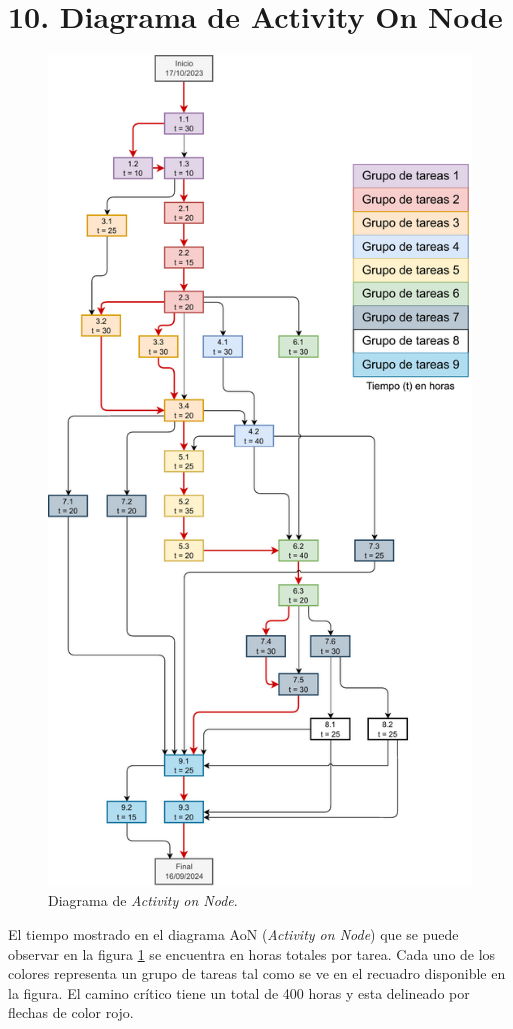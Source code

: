 \documentclass[
11pt, %
]{charter}
\begin{document}
\section{10. Diagrama de Activity On Node}
\label{sec:AoN}



\begin{figure}[htpb]
\centering 
\includegraphics[width=.7\textwidth]{./Figuras/AoN.pdf}
\caption{Diagrama de \textit{Activity on Node}.}
\label{fig:AoN}
\end{figure}

El tiempo mostrado en el diagrama AoN (\textit{Activity on Node}) que se puede observar en la figura \ref{fig:AoN} se encuentra en horas totales por tarea. Cada uno de los colores representa un grupo de tareas tal como se ve en el recuadro disponible en la figura. El camino crítico tiene un total de 400 horas y esta delineado por flechas de color rojo.
\end{document}
